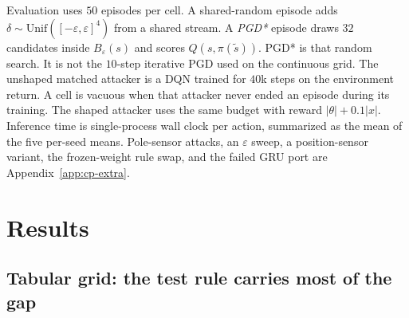 \documentclass[10pt,twocolumn]{article}
\begin{document}
Evaluation uses $50$ episodes per cell.
A shared-random episode adds $\delta\sim\mathrm{Unif}([-\varepsilon,\varepsilon]^4)$ from a shared stream.
A \emph{PGD*} episode draws $32$ candidates inside $B_\varepsilon(s)$ and scores $Q(s,\pi(\tilde s))$.
PGD* is that random search.
It is not the $10$-step iterative PGD used on the continuous grid.
The unshaped matched attacker is a DQN trained for $40$k steps on the environment return.
A cell is vacuous when that attacker never ended an episode during its training.
The shaped attacker uses the same budget with reward $|\theta|+0.1|x|$.
Inference time is single-process wall clock per action, summarized as the mean of the five per-seed means.
Pole-sensor attacks, an $\varepsilon$ sweep, a position-sensor variant, the frozen-weight rule swap, and the failed GRU port are Appendix~\ref{app:cp-extra}.

\section{Results}
\label{sec:results}

\subsection{Tabular grid: the test rule carries most of the gap}
\label{sec:gw}
\end{document}
